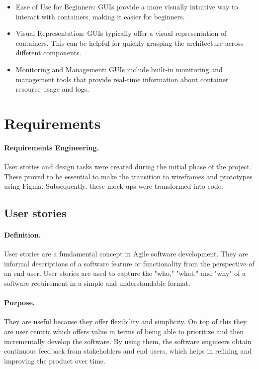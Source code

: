 \documentclass[multi, tikz, a4paper, oneside]{article}
\begin{document}
\begin{itemize}
\item Ease of Use for Beginners: GUIs provide a more visually intuitive way to
  interact with containers, making it easier for beginners.
\item Visual Representation: GUIs typically offer a visual representation of
  containers. This can be helpful for quickly grasping the architecture across
  different components.
\item Monitoring and Management: GUIs include built-in monitoring and management
  tools that provide real-time information about container resource usage and
  logs.
\end{itemize}

\section{Requirements}
\paragraph{Requirements Engineering.}
User stories and design tasks were created during the initial phase of the
project. These proved to be essential to make the transition to wireframes and
prototypes using Figma. Subsequently, these mock-ups were transformed into code.

\subsection{User stories}
\label{sec:stories}
\paragraph{Definition.}
User stories are a fundamental concept in Agile software development. They are
informal descriptions of a software feature or functionality from the
perspective of an end user. User stories are used to capture the "who," "what,"
and "why" of a software requirement in a simple and understandable format.

\paragraph{Purpose.}
They are useful because they offer flexibility and simplicity. On top of this
they are user centric which offers value in terms of being able to prioritize
and then incrementally develop the software. By using them, the software
engineers obtain continuous feedback from stakeholders and end users, which
helps in refining and improving the product over time.
\end{document}
